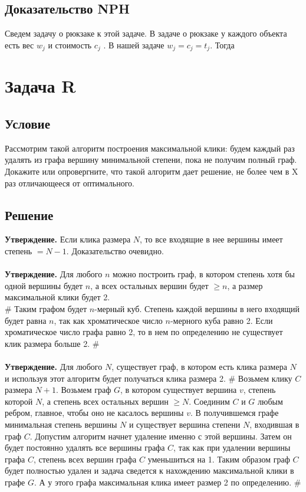 \documentclass{article}
\begin{document}
\subsection*{Доказательство NPH}
Сведем задачу о рюкзаке к этой задаче. В задаче о рюкзаке у каждого объекта есть вес $w_j$ и стоимость $c_j$ . В нашей задаче $w_j = c_j = t_j$. Тогда 

\newpage
\section*{Задача  R} 

\subsection*{Условие} 
Рассмотрим такой алгоритм построения максимальной клики: будем каждый раз
удалять из графа вершину минимальной степени, пока не получим полный граф.
Докажите или опровергните, что такой алгоритм дает решение, не более чем в X
раз отличающееся от оптимального.

\subsection*{Решение} 
\textbf{Утверждение.} Если клика размера $N$, то все входящие в нее вершины имеет степень $= N - 1$. Доказательство очевидно.
\\
\hfill \\
\textbf{Утверждение.} Для любого $n$ можно построить граф, в котором степень хотя бы одной вершины будет $n$, а всех остальных вершин будет $\geq n$, а размер максимальной клики будет 2. \\
\#
Таким графом будет $n$-мерный куб. Степень каждой вершины в него входящий будет равна $n$, так как хроматическое число $n$-мерного куба равно 2. Если хроматическое число графа равно 2, то в нем по определению не существует клик размера больше 2.
\#
\\
\hfill \\
\textbf{Утверждение.} Для любого $N$, существует граф, в котором есть клика размера $N$ и используя этот алгоритм будет получаться клика размера 2. 
\#
Возьмем клику $C$ размера $N + 1$. Возьмем граф $G$, в котором существует вершина $v$, степень которой $N$, а степень всех остальных вершин $\geq N$. Соединим $C$ и $G$ любым ребром, главное, чтобы оно не касалось вершины $v$. В получившемся графе минимальная степень вершины $N$ и существует вершина степени $N$, входившая в граф $C$. Допустим алгоритм начнет удаление именно с этой вершины. Затем он будет постоянно удалять все вершины графа $C$, так как при удалении вершины графа $C$, степень всех вершин графа $C$ уменьшиться на 1. Таким образом граф $C$ будет полностью удален и задача сведется к нахождению максимальной клики в графе $G$. А у этого графа максимальная клика имеет размер 2 по определению.
\#
\end{document}
